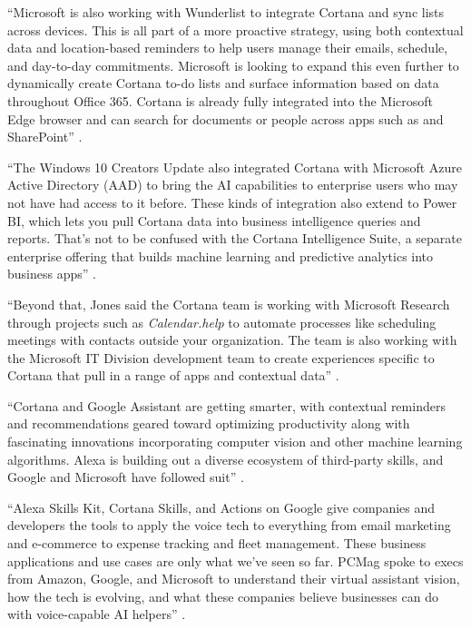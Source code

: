 ``Microsoft is also working with Wunderlist to integrate Cortana and sync lists across devices. This is all part of a more proactive strategy, using both contextual data and location-based reminders to help users manage their emails, schedule, and day-to-day commitments. Microsoft is looking to expand this even further to dynamically create Cortana to-do lists and surface information based on data throughout Office 365. Cortana is already fully integrated into the Microsoft Edge browser and can search for documents or people across apps such as and SharePoint'' \cite{Marvin2017them}.

``The Windows 10 Creators Update also integrated Cortana with Microsoft Azure Active Directory (AAD) to bring the AI capabilities to enterprise users who may not have had access to it before. These kinds of integration also extend to Power BI, which lets you pull Cortana data into business intelligence queries and reports. That's not to be confused with the Cortana Intelligence Suite, a separate enterprise offering that builds machine learning and predictive analytics into business apps'' \cite{Marvin2017them}.

``Beyond that, Jones said the Cortana team is working with Microsoft Research through projects such as {\em Calendar.help} to automate processes like scheduling meetings with contacts outside your organization. The team is also working with the Microsoft IT Division development team to create experiences specific to Cortana that pull in a range of apps and contextual data'' \cite{Marvin2017them}.

``Cortana and Google Assistant are getting smarter, with contextual reminders and recommendations geared toward optimizing productivity along with fascinating innovations incorporating computer vision and other machine learning algorithms. Alexa is building out a diverse ecosystem of third-party skills, and Google and Microsoft have followed suit'' \cite{Marvin2017them}.

``Alexa Skills Kit, Cortana Skills, and Actions on Google give companies and developers the tools to apply the voice tech to everything from email marketing and e-commerce to expense tracking and fleet management. These business applications and use cases are only what we've seen so far. PCMag spoke to execs from Amazon, Google, and Microsoft to understand their virtual assistant vision, how the tech is evolving, and what these companies believe businesses can do with voice-capable AI helpers'' \cite{Marvin2017them}.

